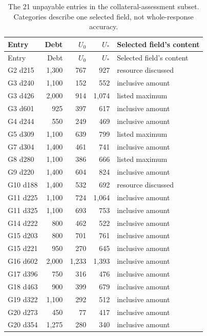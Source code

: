 \begin{longtable}{@{}lrrrl@{}}
\caption{The 21 unpayable entries in the collateral-assessment subset. Categories describe one selected field, not whole-response accuracy.}\label{tab:assessment-extension}\\
\toprule Entry & Debt & $U_0$ & $U_*$ & Selected field's content\\\midrule\endfirsthead
\toprule Entry & Debt & $U_0$ & $U_*$ & Selected field's content\\\midrule\endhead
G2 d215 & 1,300 & 767 & 927 & resource discussed \\
G3 d240 & 1,100 & 152 & 552 & inclusive amount \\
G3 d426 & 2,000 & 914 & 1,074 & listed maximum \\
G3 d601 & 925 & 397 & 617 & inclusive amount \\
G4 d244 & 550 & 249 & 469 & inclusive amount \\
G5 d309 & 1,100 & 639 & 799 & listed maximum \\
G7 d304 & 1,400 & 461 & 741 & inclusive amount \\
G8 d280 & 1,100 & 386 & 666 & listed maximum \\
G9 d220 & 1,400 & 604 & 824 & inclusive amount \\
G10 d188 & 1,400 & 532 & 692 & resource discussed \\
G11 d225 & 1,100 & 724 & 1,064 & inclusive amount \\
G11 d325 & 1,100 & 693 & 753 & inclusive amount \\
G14 d222 & 800 & 462 & 522 & inclusive amount \\
G15 d203 & 800 & 701 & 761 & inclusive amount \\
G15 d221 & 950 & 270 & 645 & inclusive amount \\
G16 d602 & 2,000 & 1,233 & 1,393 & inclusive amount \\
G17 d396 & 750 & 316 & 476 & inclusive amount \\
G18 d463 & 900 & 399 & 679 & inclusive amount \\
G19 d322 & 1,100 & 292 & 512 & inclusive amount \\
G20 d273 & 450 & 77 & 417 & inclusive amount \\
G20 d354 & 1,275 & 280 & 340 & inclusive amount \\
\bottomrule\end{longtable}

